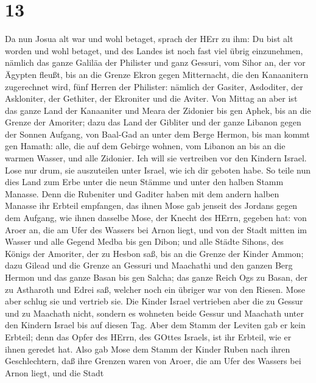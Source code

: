 \hypertarget{section-12}{%
\section{13}\label{section-12}}

 Da nun Josua alt war und wohl betaget, sprach der HErr zu
ihm: Du bist alt worden und wohl betaget, und des Landes ist noch fast
viel übrig einzunehmen,  nämlich das ganze Galiläa der
Philister und ganz Gessuri,  vom Sihor an, der vor Ägypten
fleußt, bis an die Grenze Ekron gegen Mitternacht, die den Kanaanitern
zugerechnet wird, fünf Herren der Philister: nämlich der Gasiter,
Asdoditer, der Askloniter, der Gethiter, der Ekroniter und die Aviter.
 Von Mittag an aber ist das ganze Land der Kanaaniter und
Meara der Zidonier bis gen Aphek, bis an die Grenze der Amoriter;
 dazu das Land der Gibliter und der ganze Libanon gegen der
Sonnen Aufgang, von Baal-Gad an unter dem Berge Hermon, bis man kommt
gen Hamath:  alle, die auf dem Gebirge wohnen, vom Libanon
an bis an die warmen Wasser, und alle Zidonier. Ich will sie vertreiben
vor den Kindern Israel. Lose nur drum, sie auszuteilen unter Israel, wie
ich dir geboten habe.  So teile nun dies Land zum Erbe unter
die neun Stämme und unter den halben Stamm Manasse.  Denn
die Rubeniter und Gaditer haben mit dem andern halben Manasse ihr
Erbteil empfangen, das ihnen Mose gab jenseit des Jordans gegen dem
Aufgang, wie ihnen dasselbe Mose, der Knecht des HErrn, gegeben hat:
 von Aroer an, die am Ufer des Wassers bei Arnon liegt, und
von der Stadt mitten im Wasser und alle Gegend Medba bis gen Dibon;
 und alle Städte Sihons, des Königs der Amoriter, der zu
Hesbon saß, bis an die Grenze der Kinder Ammon;  dazu
Gilead und die Grenze an Gessuri und Maachathi und den ganzen Berg
Hermon und das ganze Basan bis gen Salcha;  das ganze Reich
Ogs zu Basan, der zu Astharoth und Edrei saß, welcher noch ein übriger
war von den Riesen. Mose aber schlug sie und vertrieb sie. 
Die Kinder Israel vertrieben aber die zu Gessur und zu Maachath nicht,
sondern es wohneten beide Gessur und Maachath unter den Kindern Israel
bis auf diesen Tag.  Aber dem Stamm der Leviten gab er kein
Erbteil; denn das Opfer des HErrn, des GOttes Israels, ist ihr Erbteil,
wie er ihnen geredet hat.  Also gab Mose dem Stamm der
Kinder Ruben nach ihren Geschlechtern,  daß ihre Grenzen
waren von Aroer, die am Ufer des Wassers bei Arnon liegt, und die Stadt
